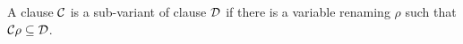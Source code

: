 \begin{definition}
	A clause \( \mathcal{C} \) is a sub-variant of clause \( \mathcal{D} \)
	if there is a variable renaming \( \rho \) such that
	\( \mathcal{C}\rho \subseteq \mathcal{D} \).
\end{definition}





















